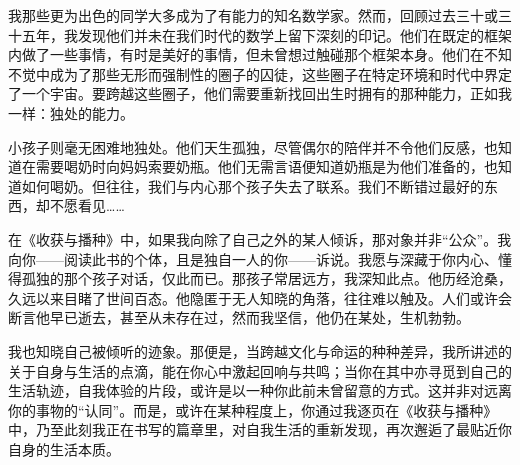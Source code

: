 我那些更为出色的同学大多成为了有能力的知名数学家。然而，回顾过去三十或三十五年，我发现他们并未在我们时代的数学上留下深刻的印记。他们在既定的框架内做了一些事情，有时是美好的事情，但未曾想过触碰那个框架本身。他们在不知不觉中成为了那些无形而强制性的圈子的囚徒，这些圈子在特定环境和时代中界定了一个宇宙。要跨越这些圈子，他们需要重新找回出生时拥有的那种能力，正如我一样：独处的能力。

小孩子则毫无困难地独处。他们天生孤独，尽管偶尔的陪伴并不令他们反感，也知道在需要喝奶时向妈妈索要奶瓶。他们无需言语便知道奶瓶是为他们准备的，也知道如何喝奶。但往往，我们与内心那个孩子失去了联系。我们不断错过最好的东西，却不愿看见……

在《收获与播种》中，如果我向除了自己之外的某人倾诉，那对象并非“公众”。我向你——阅读此书的个体，且是独自一人的你——诉说。我愿与深藏于你内心、懂得孤独的那个孩子对话，仅此而已。那孩子常居远方，我深知此点。他历经沧桑，久远以来目睹了世间百态。他隐匿于无人知晓的角落，往往难以触及。人们或许会断言他早已逝去，甚至从未存在过，然而我坚信，他仍在某处，生机勃勃。

我也知晓自己被倾听的迹象。那便是，当跨越文化与命运的种种差异，我所讲述的关于自身与生活的点滴，能在你心中激起回响与共鸣；当你在其中亦寻觅到自己的生活轨迹，自我体验的片段，或许是以一种你此前未曾留意的方式。这并非对远离你的事物的“认同”。而是，或许在某种程度上，你通过我逐页在《收获与播种》中，乃至此刻我正在书写的篇章里，对自我生活的重新发现，再次邂逅了最贴近你自身的生活本质。